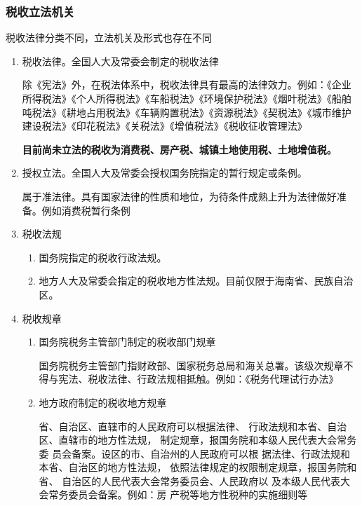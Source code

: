 \documentclass[UTF8,12pt]{ctexart}
\numberwithin{equation}{section} %
\numberwithin{figure}{section}
\numberwithin{table}{section}
\begin{document}
	\subsubsection{税收立法机关}
	税收法律分类不同，立法机关及形式也存在不同
	\begin{enumerate}
		\item 税收法律。全国人大及常委会制定的税收法律
		
		除《宪法》外，在税法体系中，税收法律具有最高的法律效力。例如：《企业所得税法》《个人所得税法》《车船税法》《环境保护税法》《烟叶税法》《船舶吨税法》《耕地占用税法》《车辆购置税法》《资源税法》《契税法》《城市维护建设税法》《印花税法》《关税法》《增值税法》《税收征收管理法》
		
		\textbf{目前尚未立法的税收为消费税、房产税、城镇土地使用税、土地增值税。}
		
		\item 授权立法。全国人大及常委会授权国务院指定的暂行规定或条例。
		
		属于准法律。具有国家法律的性质和地位，为待条件成熟上升为法律做好准备。例如消费税暂行条例
		
		\item 税收法规
		\begin{enumerate}
			\item 国务院指定的税收行政法规。
			
			\item 地方人大及常委会指定的税收地方性法规。目前仅限于海南省、民族自治区。
		\end{enumerate}
		
		\item 税收规章
		\begin{enumerate}
			\item 国务院税务主管部门制定的税收部门规章
			
			国务院税务主管部门指财政部、国家税务总局和海关总署。该级次规章不得与宪法、税收法律、行政法规相抵触。例如：《税务代理试行办法》
			
			\item 地方政府制定的税收地方规章
			
			省、自治区、直辖市的人民政府可以根据法律、
			行政法规和本省、自治区、直辖市的地方性法规，
			制定规章，报国务院和本级人民代表大会常务委
			员会备案。设区的市、自治州的人民政府可以根
			据法律、行政法规和本省、自治区的地方性法规，
			依照法律规定的权限制定规章，报国务院和省、
			自治区的人民代表大会常务委员会、人民政府以
			及本级人民代表大会常务委员会备案。例如：房
			产税等地方性税种的实施细则等
		\end{enumerate}
	\end{enumerate}
	
\end{document}
